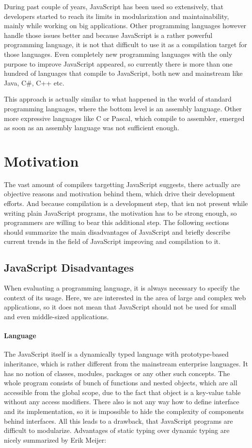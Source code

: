 \documentclass[12pt,a4paper]{report}
\begin{document}
During past couple of years, JavaScript has been used so extensively, that developers started to reach its limits in modularization and maintainability, mainly while working on big applications. Other programming languages however handle those issues better and because JavaScript is a rather powerful programming language, it is not that difficult to use it as a compilation target for those languages. Even completely new programming languages with the only purpose to improve JavaScript appeared, so currently there is more than one hundred of languages that compile to JavaScript\cite{Backends}, both new and mainstream like Java, C\#, C++ etc.

This approach is actually similar to what happened in the world of standard programming languages, where the bottom level is an assembly language. Other more expressive languages like C or Pascal, which compile to assembler, emerged as soon as an assembly language was not sufficient enough.

\section{Motivation}

The vast amount of compilers targetting JavaScript suggests, there actually are objective reasons and motivation behind them, which drive their development efforts. And because compilation is a development step, that isn not present while writing plain JavaScript programs, the motivation has to be strong enough, so programmers are willing to bear this additional step. The following sections should summarize the main disadvantages of JavaScript and briefly describe current trends in the field of JavaScript improving and compilation to it.

\subsection{JavaScript Disadvantages}

When evaluating a programming language, it is always necessary to specify the context of its usage. Here, we are interested in the area of large and complex web applications, so it does not mean that JavaScript should not be used for small and even middle-sized applications.

\paragraph{Language} The JavaScript itself is a dynamically typed language with prototype-based inheritance, which is rather different from the mainstream enterprise languages. It has no notion of classes, modules, packages or any other such concepts. The whole program consists of bunch of functions and nested objects, which are all accessible from the global scope, due to the fact that object is a key-value table without any access modifiers. There also is not any way how to define interface and its implementation, so it is impossible to hide the complexity of components behind interfaces. All this leads to a drawback, that JavaScript programs are difficult to modularize. Advantages of static typing over dynamic typing are nicely summarized by Erik Meijer\cite{Meijer}: 
\end{document}
